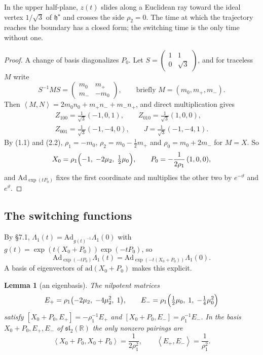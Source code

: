 \documentclass[11pt,a4paper]{article}
\theoremstyle{plain}
\newtheorem{lemma}[theorem]{Lemma}
\theoremstyle{definition}
\theoremstyle{remark}
\newcommand{\bracks}[2]{\left\langle #1,#2\right\rangle}
\newcommand{\hstar}{\mathfrak{h}^{\star}}
\newcommand{\Ad}{\mathrm{Ad}}
\newcommand{\ad}{\mathrm{ad}}
\renewcommand{\sl}{\mathfrak{sl}_2}
\newcommand{\R}{\mathbb{R}}
\begin{document}
In the upper half-plane, $z(t)$ slides along a Euclidean ray toward the ideal vertex $1/\sqrt3$ of
$\hstar$ and crosses the side $\rho_2=0$. The time at which the trajectory reaches the boundary
has a closed form; the switching time is the only time without one.

\begin{proof}
A change of basis diagonalizes $P_0$. Let $S=\left(\begin{smallmatrix}1&1\\0&\sqrt3\end{smallmatrix}\right)$,
and for traceless $M$ write
\[
S^{-1}MS=\begin{pmatrix}m_0&m_+\\m_-&-m_0\end{pmatrix},\qquad\text{briefly } M=(m_0,m_+,m_-).
\]
Then $\bracks MN=2m_0n_0+m_+n_-+m_-n_+$, and direct multiplication gives
\begin{equation}\tag{2.2}
\begin{gathered}
Z_{100}=\tfrac1{\sqrt3}(-1,0,1),\qquad Z_{010}=\tfrac1{\sqrt3}(1,0,0),\\
Z_{001}=\tfrac1{\sqrt3}(-1,-4,0),\qquad J=\tfrac1{\sqrt3}(-1,-4,1).
\end{gathered}
\end{equation}
By (1.1) and (2.2), $\rho_1=-m_0$, $\rho_2=m_0-\frac12m_+$ and $\rho_0=m_0+2m_-$ for $M=X$. So
\[
X_0=\rho_1\Bigl(-1,\;-2\mu_2,\;\tfrac12\mu_0\Bigr),\qquad
P_0=-\frac{1}{2\rho_1}\,(1,0,0),
\]
and $\Ad_{\exp(tP_0)}$ fixes the first coordinate and multiplies the other two by $e^{-\vartheta}$ and
$e^{\vartheta}$.
\end{proof}

\subsection*{The switching functions}

By \S7.1, $\Lambda_1(t)=\Ad_{g(t)^{-1}}\Lambda_1(0)$ with
$g(t)=\exp(t(X_0+P_0))\exp(-tP_0)$, so
\[
\Ad_{\exp(-tP_0)}\Lambda_1(t)=\Ad_{\exp(-t(X_0+P_0))}\Lambda_1(0).
\]
A basis of eigenvectors of $\ad(X_0+P_0)$ makes this explicit.

\begin{lemma}[an eigenbasis]
The nilpotent matrices
\[
E_+=\rho_1\bigl(-2\mu_2,\;-4\mu_2^2,\;1\bigr),\qquad E_-=\rho_1\Bigl(\tfrac12\mu_0,\;1,\;-\tfrac14\mu_0^2\Bigr)
\]
satisfy $[X_0+P_0,E_+]=-\rho_1^{-1}E_+$ and $[X_0+P_0,E_-]=\rho_1^{-1}E_-$. In the basis
$X_0+P_0,E_+,E_-$ of $\sl(\R)$ the only nonzero pairings are
\[
\bracks{X_0+P_0}{X_0+P_0}=\frac1{2\rho_1^2},\qquad \bracks{E_+}{E_-}=\frac1{\rho_1^2}.
\]
\end{lemma}
\end{document}
